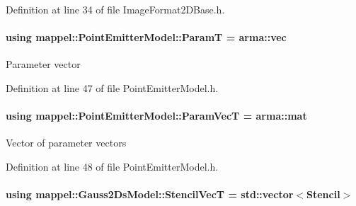Definition at line 34 of file Image\+Format2\+D\+Base.\+h.

\paragraph[{\texorpdfstring{ParamT}{ParamT}}]{\setlength{\rightskip}{0pt plus 5cm}using {\bf mappel\+::\+Point\+Emitter\+Model\+::\+ParamT} =  arma\+::vec\hspace{0.3cm}{\ttfamily [inherited]}}\hypertarget{classmappel_1_1PointEmitterModel_a665ec6aea3aac139bb69a23c06d4b9a1}{}\label{classmappel_1_1PointEmitterModel_a665ec6aea3aac139bb69a23c06d4b9a1}
Parameter vector 

Definition at line 47 of file Point\+Emitter\+Model.\+h.

\paragraph[{\texorpdfstring{Param\+VecT}{ParamVecT}}]{\setlength{\rightskip}{0pt plus 5cm}using {\bf mappel\+::\+Point\+Emitter\+Model\+::\+Param\+VecT} =  arma\+::mat\hspace{0.3cm}{\ttfamily [inherited]}}\hypertarget{classmappel_1_1PointEmitterModel_add253b568d763f1513a810aac35de719}{}\label{classmappel_1_1PointEmitterModel_add253b568d763f1513a810aac35de719}
Vector of parameter vectors 

Definition at line 48 of file Point\+Emitter\+Model.\+h.

\paragraph[{\texorpdfstring{Stencil\+VecT}{StencilVecT}}]{\setlength{\rightskip}{0pt plus 5cm}using {\bf mappel\+::\+Gauss2\+Ds\+Model\+::\+Stencil\+VecT} =  std\+::vector$<${\bf Stencil}$>$}\hypertarget{classmappel_1_1Gauss2DsModel_ad4e1cca4ec2258c99fe7ca32fff3517a}{}\label{classmappel_1_1Gauss2DsModel_ad4e1cca4ec2258c99fe7ca32fff3517a}


